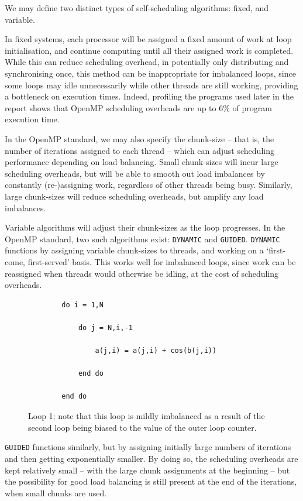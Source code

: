 \documentclass{article} %
\newcommand{\tp}{\texttt}
\begin{document}
We may define two distinct types of self-scheduling algorithms: fixed, and variable.

In fixed systems, each processor will be assigned a fixed amount of work at loop initialisation, and continue computing until all their assigned work is completed.
While this can reduce scheduling overhead, in potentially only distributing and synchronising once, this method can be inappropriate for imbalanced loops, since some loops may idle unnecessarily while other threads are still working, providing a bottleneck on execution times.
Indeed, profiling the programs used later in the report shows that OpenMP scheduling overheads are up to 6\% of program execution time.

In the OpenMP standard, we may also specify the chunk-size -- that is, the number of iterations assigned to each thread -- which can adjust scheduling performance depending on load balancing.
Small chunk-sizes will incur large scheduling overheads, but will be able to smooth out load imbalances by constantly (re-)assigning work, regardless of other threads being busy.
Similarly, large chunk-sizes will reduce scheduling overheads, but amplify any load imbalances.

Variable algorithms will adjust their chunk-sizes as the loop progresses. 
In the OpenMP standard, two such algorithms exist: \tp{DYNAMIC} and \tp{GUIDED}.
\tp{DYNAMIC} functions by assigning variable chunk-sizes to threads, and working on a `first-come, first-served' basis.
This works well for imbalanced loops, since work can be reassigned when threads would otherwise be idling, at the cost of scheduling overheads.

\begin{figure}
    \begin{lstlisting}
        do i = 1,N

            do j = N,i,-1
        
                a(j,i) = a(j,i) + cos(b(j,i))
        
            end do
      
        end do
    \end{lstlisting}
    \caption{Loop 1; note that this loop is mildly imbalanced as a result of the second loop being biased to the value of the outer loop counter.}
    \label{listing:loop1}
\end{figure}

\tp{GUIDED} functions similarly, but by assigning initially large numbers of iterations and then getting exponentially smaller.
By doing so, the scheduling overheads are kept relatively small -- with the large chunk assignments at the beginning -- but the possibility for good load balancing is still present at the end of the iterations, when small chunks are used.
\end{document}
